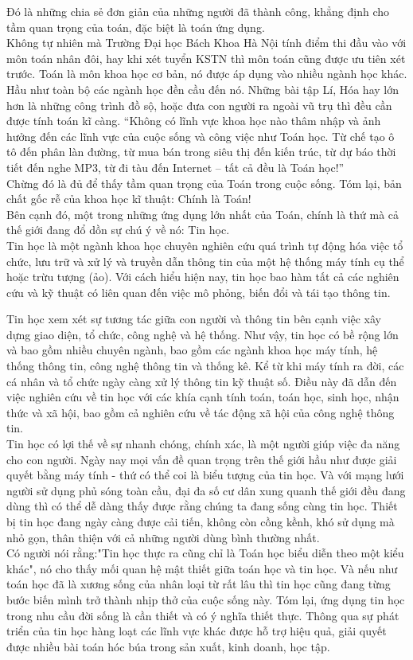 \documentclass[12pt,a4paper]{report}
\begin{document}
    Đó là những chia sẻ đơn giản của những người đã thành công, khẳng định cho tầm quan trọng của toán, đặc biệt là toán ứng dụng. \\
    Không tự nhiên mà Trường Đại học Bách Khoa Hà Nội tính điểm thi đầu vào với môn toán nhân đôi, hay khi xét tuyển KSTN thì môn toán cũng được ưu tiên xét trước. Toán là môn khoa học cơ bản, nó được áp dụng vào nhiều ngành học khác. Hầu như toàn bộ các ngành học đền cầu đến nó. Những bài tập Lí, Hóa hay lớn hơn là những công trình đồ sộ, hoặc đưa con người ra ngoài vũ trụ thì đều cần được tính toán kĩ càng.  “Không có lĩnh vực khoa học nào thâm nhập và ảnh hưởng đến các lĩnh vực của cuộc sống và công việc như Toán học. Từ chế tạo ô tô đến phân làn đường, từ mua bán trong siêu thị đến kiến trúc, từ dự báo thời tiết đến nghe MP3, từ đi tàu đến Internet – tất cả đều là Toán học!”\\ Chừng đó là đủ để thấy tầm quan trọng của Toán trong cuộc sống. Tóm lại, bản chất gốc rễ của khoa học kĩ thuật: Chính là Toán!\\ Bên cạnh đó, một trong những ứng dụng lớn nhất của Toán, chính là thứ mà cả thế giới đang đổ dồn sự chú ý về nó: Tin học.\\ Tin học là một ngành khoa học chuyên nghiên cứu quá trình tự động hóa việc tổ chức, lưu trữ và xử lý và truyền dẫn thông tin của một hệ thống máy tính cụ thể hoặc trừu tượng (ảo). Với cách hiểu hiện nay, tin học bao hàm tất cả các nghiên cứu và kỹ thuật có liên quan đến việc mô phỏng, biến đổi và tái tạo thông tin.

    Tin học xem xét sự tương tác giữa con người và thông tin bên cạnh việc xây dựng giao diện, tổ chức, công nghệ và hệ thống. Như vậy, tin học có bề rộng lớn và bao gồm nhiều chuyên ngành, bao gồm các ngành khoa học máy tính, hệ thống thông tin, công nghệ thông tin và thống kê. Kể từ khi máy tính ra đời, các cá nhân và tổ chức ngày càng xử lý thông tin kỹ thuật số. Điều này đã dẫn đến việc nghiên cứu về tin học với các khía cạnh tính toán, toán học, sinh học, nhận thức và xã hội, bao gồm cả nghiên cứu về tác động xã hội của công nghệ thông tin. \\ Tin học có lợi thế về sự nhanh chóng, chính xác, là một người giúp việc đa năng cho con người. Ngày nay mọi vấn đề quan trọng trên thế giới hầu như được giải quyết bằng máy tính - thứ có thể coi là biểu tượng của tin học. Và với mạng lưới người sử dụng phủ sóng toàn cầu, đại đa số cư dân xung quanh thế giới đều đang dùng thì có thể dễ dàng thấy được rằng chúng ta đang sống cùng tin học. Thiết bị tin học đang ngày càng được cải tiến, không còn cồng kềnh, khó sử dụng mà nhỏ gọn, thân thiện với cả những người dùng bình thường nhất.\\ Có người nói rằng:"Tin học thực ra cũng chỉ là Toán học biểu diễn theo một kiểu khác", nó cho thấy mối quan hệ mật thiết giữa toán học và tin học. Và nếu như toán học đã là xương sống của nhân loại từ rất lâu thì tin học cũng đang từng bước biến mình trở thành nhịp thở của cuộc sống này. Tóm lại, ứng dụng tin học trong nhu cầu đời sống là cần thiết và có ý nghĩa thiết thực. Thông qua sự phát triển của tin học hàng loạt các lĩnh vực khác được hỗ trợ hiệu quả, giải quyết được nhiều bài toán hóc búa trong sản xuất, kinh doanh, học tập.\newpage
\end{document}
